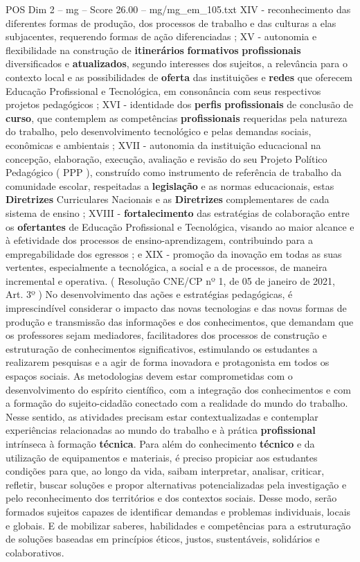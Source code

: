 \begin{textsample}{POS Dim 2 – mg – Score 26.00 – mg/mg\_em\_105.txt}
XIV - reconhecimento das diferentes formas de produção, dos processos de trabalho e das culturas a elas subjacentes, requerendo formas de ação diferenciadas ; XV - autonomia e flexibilidade na construção de \textbf{itinerários} \textbf{formativos} \textbf{profissionais} diversificados e \textbf{atualizados}, segundo interesses dos sujeitos, a relevância para o contexto local e as possibilidades de \textbf{oferta} das instituições e \textbf{redes} que oferecem Educação Profissional e Tecnológica, em consonância com seus respectivos projetos pedagógicos ; XVI - identidade dos \textbf{perfis} \textbf{profissionais} de conclusão de \textbf{curso}, que contemplem as competências \textbf{profissionais} requeridas pela natureza do trabalho, pelo desenvolvimento tecnológico e pelas demandas sociais, econômicas e ambientais ; XVII - autonomia da instituição educacional na concepção, elaboração, execução, avaliação e revisão do seu Projeto Político Pedagógico ( PPP ), construído como instrumento de referência de trabalho da comunidade escolar, respeitadas a \textbf{legislação} e as normas educacionais, estas \textbf{Diretrizes} Curriculares Nacionais e as \textbf{Diretrizes} complementares de cada sistema de ensino ; XVIII - \textbf{fortalecimento} das estratégias de colaboração entre os \textbf{ofertantes} de Educação Profissional e Tecnológica, visando ao maior alcance e à efetividade dos processos de ensino-aprendizagem, contribuindo para a empregabilidade dos egressos ; e XIX - promoção da inovação em todas as suas vertentes, especialmente a tecnológica, a social e a de processos, de maneira incremental e operativa. ( Resolução CNE/CP nº 1, de 05 de janeiro de 2021, Art. 3º ) No desenvolvimento das ações e estratégias pedagógicas, é imprescindível considerar o impacto das novas tecnologias e das novas formas de produção e transmissão das informações e dos conhecimentos, que demandam que os professores sejam mediadores, facilitadores dos processos de construção e estruturação de conhecimentos significativos, estimulando os estudantes a realizarem pesquisas e a agir de forma inovadora e protagonista em todos os espaços sociais.
As metodologias devem estar comprometidas com o desenvolvimento do espírito científico, com a integração dos conhecimentos e com a formação do sujeito-cidadão conectado com a realidade do mundo do trabalho.
Nesse sentido, as atividades precisam estar contextualizadas e contemplar experiências relacionadas ao mundo do trabalho e à prática \textbf{profissional} intrínseca à formação \textbf{técnica}.
Para além do conhecimento \textbf{técnico} e da utilização de equipamentos e materiais, é preciso propiciar aos estudantes condições para que, ao longo da vida, saibam interpretar, analisar, criticar, refletir, buscar soluções e propor alternativas potencializadas pela investigação e pelo reconhecimento dos territórios e dos contextos sociais.
Desse modo, serão formados sujeitos capazes de identificar demandas e problemas individuais, locais e globais.
E de mobilizar saberes, habilidades e competências para a estruturação de soluções baseadas em princípios éticos, justos, sustentáveis, solidários e colaborativos.


\end{textsample}
